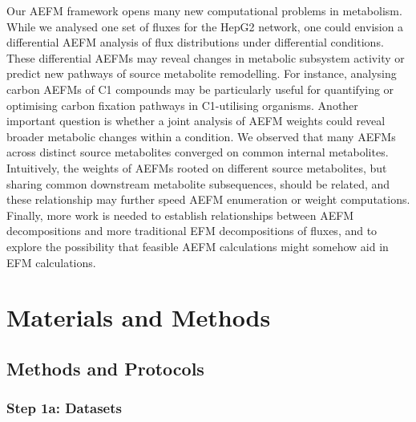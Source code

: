 \documentclass[12pt]{article}
\begin{document}
Our AEFM framework opens many new computational problems in metabolism.
While we analysed one set of fluxes for the HepG2 network, one could
envision a differential AEFM analysis of flux distributions under
differential conditions. These differential AEFMs may reveal changes in
metabolic subsystem activity or predict new pathways of source metabolite
remodelling. For instance, analysing carbon AEFMs of C1 compounds may be
particularly useful for quantifying or optimising carbon fixation pathways
in C1-utilising organisms. Another important question is whether a joint
analysis of AEFM weights could reveal broader metabolic changes within
a condition. We observed that many AEFMs across distinct source
metabolites converged on common internal metabolites. Intuitively, the
weights of AEFMs rooted on different source metabolites, but sharing
common downstream metabolite subsequences, should be related, and these
relationship may further speed AEFM enumeration or weight computations.
Finally, more work is needed to establish relationships between AEFM
decompositions and more traditional EFM decompositions of fluxes, and to
explore the possibility that feasible AEFM calculations might somehow aid
in EFM calculations.

\section*{Materials and Methods}



\subsection*{Methods and Protocols}

\subsubsection*{Step 1a: Datasets}
\end{document}

